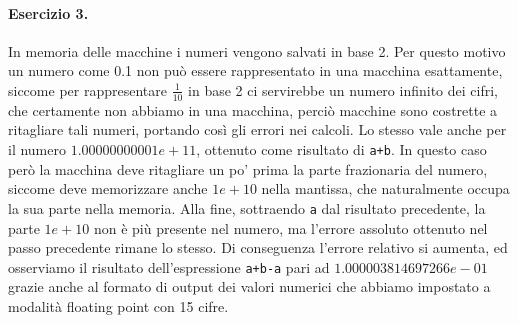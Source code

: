 \paragraph{Esercizio 3.} In memoria delle macchine i numeri vengono salvati in base 2. Per questo motivo un numero come 0.1 non può essere rappresentato in una macchina esattamente, siccome per rappresentare $\frac{1}{10}$ in base 2 ci servirebbe un numero infinito dei cifri, che certamente non abbiamo in una macchina, perciò macchine sono costrette a ritagliare tali numeri, portando così gli errori nei calcoli. Lo stesso vale anche per il numero $1.00000000001e+11$, ottenuto come risultato di \verb|a+b|. In questo caso però la macchina deve ritagliare un po' prima la parte frazionaria del numero, siccome deve memorizzare anche $1e+10$ nella mantissa, che naturalmente occupa la sua parte nella memoria. Alla fine, sottraendo \verb|a| dal risultato precedente, la parte $1e+10$ non è più presente nel numero, ma l'errore assoluto ottenuto nel passo precedente rimane lo stesso. Di conseguenza l'errore relativo si aumenta, ed osserviamo il risultato dell'espressione \verb|a+b-a| pari ad $1.000003814697266e-01$ grazie anche al formato di output dei valori numerici che abbiamo impostato a modalità floating point con 15 cifre.
